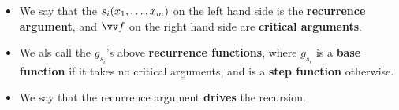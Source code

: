 \begin{itemize}

\item We say that the $s_i{\mathopen{}\left({x_1,\ldots,x_m}\right)\mathclose{}}$ on the left hand side is the
\textbf{recurrence argument}, and $\vect{f}$ on the right hand side are
\textbf{critical arguments}.


\item We als call the $g_{s_i}$'s above \textbf{recurrence functions}, where
$g_{s_i}$ is a \textbf{base function} if it takes no critical arguments, and is
a \textbf{step function} otherwise.


\item We say that the recurrence argument \textbf{drives} the recursion.


\end{itemize}

